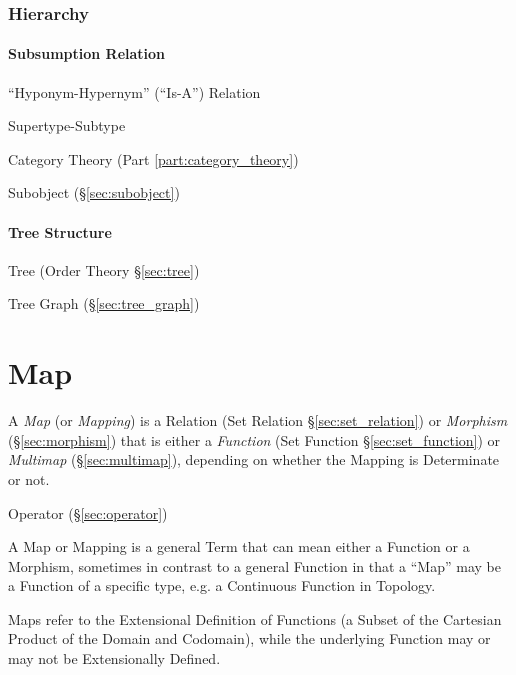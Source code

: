 \subsubsection{Hierarchy}\label{sec:hierarchy}

\paragraph{Subsumption Relation}\label{sec:subsumption_relation}\hfill

``Hyponym-Hypernym'' (``Is-A'') Relation


Supertype-Subtype

Category Theory (Part \ref{part:category_theory})

Subobject (\S\ref{sec:subobject})



\paragraph{Tree Structure}\label{sec:tree_structure}\hfill

Tree (Order Theory \S\ref{sec:tree})

Tree Graph (\S\ref{sec:tree_graph})



\section{Map}\label{sec:map}

A \emph{Map} (or \emph{Mapping}) is a Relation (Set Relation
\S\ref{sec:set_relation}) or \emph{Morphism} (\S\ref{sec:morphism})
that is either a \emph{Function} (Set Function
\S\ref{sec:set_function}) or \emph{Multimap} (\S\ref{sec:multimap}),
depending on whether the Mapping is Determinate or not.

Operator (\S\ref{sec:operator})

A Map or Mapping is a general Term that can mean either a Function or
a Morphism, sometimes in contrast to a general Function in that a
``Map'' may be a Function of a specific type, e.g. a Continuous
Function in Topology.

Maps refer to the Extensional Definition of Functions (a Subset of the
Cartesian Product of the Domain and Codomain), while the underlying
Function may or may not be Extensionally Defined.

